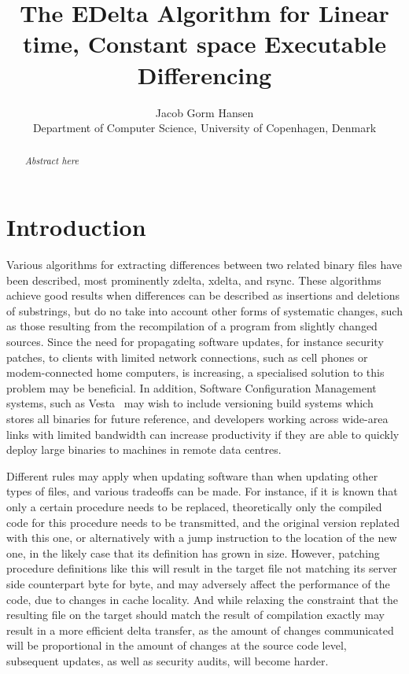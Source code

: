 \documentclass[10pt,twocolumn]{article}
\begin{document}
\title{\Large \bf The EDelta Algorithm for Linear time, Constant space
Executable Differencing}

\author{
{\rm Jacob Gorm Hansen}
\\Department of Computer Science, University of Copenhagen, Denmark
}

\maketitle

\begin{abstract}
{\small\it Abstract here}
\end{abstract}

\section{Introduction}

Various algorithms for extracting differences between two related binary files
have been described, most prominently zdelta, xdelta, and rsync. These
algorithms achieve good results when differences can be described as insertions
and deletions of substrings, but do no take into account other forms of
systematic changes, such as those resulting from the recompilation of a program
from slightly changed sources. Since the need for propagating software updates,
for instance security patches, to clients with limited network connections, such
as cell phones or modem-connected home computers, is increasing, a specialised
solution to this problem may be beneficial. In addition, Software Configuration
Management systems, such as Vesta~\cite{vesta} may wish to include versioning
build systems which stores all binaries for future reference, and developers
working across wide-area links with limited bandwidth can increase productivity
if they are able to quickly deploy large binaries to machines in remote data
centres.

Different rules may apply when updating software than when updating other types
of files, and various tradeoffs can be made. For instance, if it is known that
only a certain procedure needs to be replaced, theoretically only the compiled
code for this procedure needs to be transmitted, and the original version
replated with this one, or alternatively with a jump instruction to the location
of the new one, in the likely case that its definition has grown in size. However,
patching procedure definitions like this will result in the target file not
matching its server side counterpart byte for byte, and may adversely affect the
performance of the code, due to changes in cache locality.  And while relaxing
the constraint that the resulting file on the target should match the result of
compilation exactly may result in a more efficient delta transfer, as the amount
of changes communicated will be proportional in the amount of changes at the
source code level, subsequent updates, as well as security audits, will become
harder.
\end{document}
